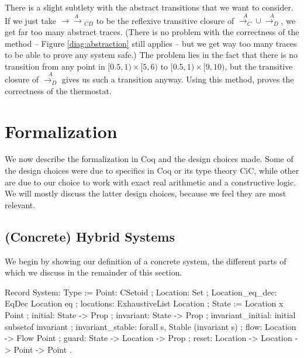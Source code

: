 \documentclass[runningheads]{llncs}
\newcommand{\ADAM}[1] {\todo{\textsc{Adam says}: #1}}
\newcommand{\weg}[1]{}
\newcommand{\doubleheadrightarrow}{\mathrel{\rightarrow\!\!\!\!\rightarrow}}
\newcommand{\attrans}{\stackrel{A}{\doubleheadrightarrow_{CD}}}
\newcommand{\acontrans}{\stackrel{A}{\rightarrow_C}}
\newcommand{\adistrans}{\stackrel{A}{\rightarrow_D}}
\begin{document}
There is a slight subtlety with the abstract transitions that we want
to consider. If we just take $\attrans$ to be the reflexive transitive
closure of $\acontrans \cup \adistrans$, we get far too many abstract
traces. (There is no problem with the correctness of the method --
Figure \ref{diag:abstraction} still applies -- but we get way too many
traces to be able to prove any system safe.) The problem lies in the
fact that there is no transition from any point in $[0.5,1)
  \times[5,6)$ to $[0.5,1) \times[9,10)$, but the transitive closure
        of $\adistrans$ gives us such a transition anyway. 
Using this method, \cite{alur} proves the correctness of the thermostat. 

\weg{
\section{Motivation}

1. Verify the correctness of the abstraction itself

2. Avoid Floating Point arithmetic

3. Avoid correctness proofs of systems that are ``almost wrong''.
   (Add one arrow to Thermostat!)

- One cannot decide x>0 of a measured value
- One can't define a function on the basis of distinguishing x<=y \/ x >y
}


\section{Formalization}
We now describe the formalization in Coq and the design choices
made. Some of the design choices were due to specifics in Coq or its
type theory CiC, while other are due to our choice to work with exact
real arithmetic and a constructive logic. We will mostly discuss the
latter design choices, because we feel they are most relevant.

\subsection{(Concrete) Hybrid Systems}
\label{concrete}

We begin by showing our definition of a concrete system, the different
parts of which we discuss in the remainder of this section.

\begin{code}
Record System: Type :=
  { Point: CSetoid
  ; Location: Set
  ; Location_eq_dec: EqDec Location eq
  ; locations: ExhaustiveList Location
  ; State :=  Location x Point
  ; initial: State -> Prop
  ; invariant: State -> Prop
  ; invariant_initial: initial subsetof invariant
  ; invariant_stable: forall s, Stable (invariant s)
  ; flow: Location -> Flow Point
  ; guard: State -> Location -> Prop
  ; reset: Location -> Location -> Point -> Point
  }.
\end{code}
\end{document}

